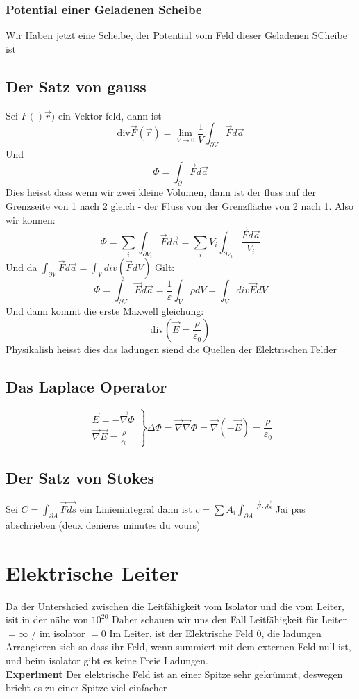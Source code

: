 \documentclass{article}
\newcommand{\experiment}{\\[2ex]\textbf{Experiment }}
\begin{document}
\subsubsection{Potential einer Geladenen Scheibe} Wir Haben jetzt eine Scheibe, der Potential vom Feld dieser Geladenen SCheibe ist
\subsection{Der Satz von gauss} Sei $F()\vec{r})$ ein Vektor feld, dann ist \[\text{div}\vec{F}(\vec{r})=\lim_{V\rightarrow0}\frac{1}{V}\int_{\partial V}\vec{F}d\vec{a}\]
Und \[\Phi=\int_{\partial}\vec{F}d\vec{a}\] Dies heisst dass wenn wir zwei kleine Volumen, dann ist der fluss auf der Grenzseite von 1 nach 2 gleich - der Fluss von der Grenzfläche von 2 nach 1. Also wir konnen:
\[\Phi=\sum_i\int_{\partial V_i}\vec{F}d\vec{a}=\sum_iV_i\int_{\partial V_i}\frac{\vec{F}d\vec{a}}{V_i}\] Und da $\int_{\partial V}\vec{F}d\vec{a}=\int_{V}div(\vec{F}dV)$ Gilt:\[\Phi=\int_{\partial V}\vec{E}d\vec{a}=\frac{1}{\varepsilon}\int_V\rho dV=\int_Vdiv\vec{E}dV\]
Und dann kommt die erste Maxwell gleichung:\[\text{div}(\vec{E}=\frac{\rho}{\varepsilon_0})\]
Physikalish heisst dies das ladungen siend die Quellen der Elektrischen Felder
\subsection{Das Laplace Operator}\[\left.\begin{matrix}\vec{E}=-\vec{\nabla}\Phi\\\vec{\nabla}\vec{E}=\frac{\rho}{\varepsilon_0}\end{matrix}\right\rbrace 
\Delta \Phi=\vec{\nabla}\vec{\nabla}\Phi=\vec{\nabla}(-\vec{E})=\frac{\rho}{\varepsilon_0}\]
\subsection{Der Satz von Stokes} Sei $C=\int_{\partial A} \vec{F}\vec{ds}$ ein Linienintegral dann ist $c=\sum A_i\int_{\partial A}\frac{\vec{F}\cdot\vec{ds}}{...}$ Jai pas abschrieben (deux denieres minutes du vours)
\section{Elektrische Leiter} Da der Untershcied zwischen die Leitfähigkeit vom Isolator und die vom Leiter, isit in der nähe von $10^20$ Daher schauen wir uns den Fall Leitfähigkeit für Leiter $=\infty$ / im isolator $=0$
\newline Im Leiter, ist der Elektrische Feld $0$, die ladungen Arrangieren sich so dass ihr Feld, wenn summiert mit dem externen Feld null ist, und beim isolator gibt es keine Freie Ladungen.
\experiment Der elektrische Feld ist an einer Spitze sehr gekrümmt, deswegen bricht es zu einer Spitze viel einfacher
\end{document}
